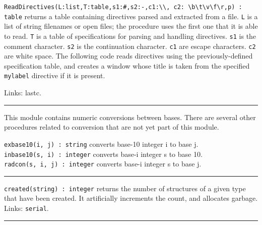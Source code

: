 \texttt{ReadDirectives(L:list,T:table,s1:{\textquotedbl}\#{\textquotedbl},s2:{\textquotedbl}-{\textquotedbl},c1:{\textquotesingle}{\textbackslash}{\textbackslash}{\textquotesingle},
c2:{\textquotesingle}
{\textbackslash}b{\textbackslash}t{\textbackslash}v{\textbackslash}f{\textbackslash}r{\textquotesingle},p)
: table} returns a table containing directives parsed and extracted
from a file. \texttt{L} is a list of string filenames or open files;
the procedure uses the first one that it is able to read. \texttt{T} is
a table of specifications for parsing and handling directives.
\texttt{s1} is the comment character. \texttt{s2} is the continuation
character. \texttt{c1} are escape characters. \texttt{c2} are white
space. The following code reads directives using the previously-defined
specification table, and creates a window whose title is taken from the
specified \texttt{mylabel} directive if it is present.


Links: lastc.

\vspace{0.25cm}\hrule{}

This module contains numeric conversions between
bases. There are several other procedures related
to conversion that are not yet part of this module. 

\texttt{exbase10(i, j) : string} converts base-10 integer i to base
j.\\
\texttt{inbase10(s, i) : integer} converts base-i integer s to base
10.\\
\texttt{radcon(s, i, j) : integer} converts base-i integer s to base j.

\vspace{0.25cm}\hrule{}

\texttt{created(string) : integer} returns the number of structures of a
given type that have been created. It artificially increments the
count, and allocates garbage. Links: \texttt{serial}. 

\vspace{0.25cm}\hrule{}

